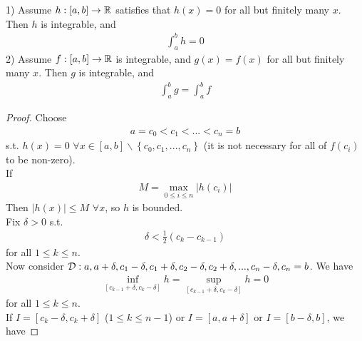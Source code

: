 \documentclass[a4paper]{article}
\begin{document}
\begin{prop}
1) Assume $h:\left[a,b\right]\to\mathbb{R}$ satisfies that $h\left(x\right)=0$ for all but finitely many $x$. Then $h$ is integrable, and
\begin{equation*}
\begin{aligned}
\int_a^b h = 0
\end{aligned}
\end{equation*}
2) Assume $f:\left[a,b\right] \to \mathbb{R}$ is integrable, and $g\left(x\right) = f\left(x\right)$ for all but finitely many $x$. Then $g$ is integrable, and
\begin{equation*}
\begin{aligned}
\int_a^b g = \int_a^b f
\end{aligned}
\end{equation*}
\begin{proof}
Choose
\begin{equation*}
\begin{aligned}
a=c_0 < c_1 < ... < c_n = b
\end{aligned}
\end{equation*}
s.t. $h\left(x\right) = 0$ $\forall x\in \left[a,b\right]\backslash\left\{c_0,c_1,...,c_n\right\}$ (it is not necessary for all of $f\left(c_i\right)$ to be non-zero).\\
If
\begin{equation*}
\begin{aligned}
M=\max_{0\leq i \leq n} |h\left(c_i\right)|
\end{aligned}
\end{equation*}
Then $|h\left(x\right)| \leq M$ $\forall x$, so $h$ is bounded.\\
Fix $\delta > 0$ s.t.
\begin{equation*}
\begin{aligned}
\delta < \frac{1}{2}\left(c_k - c_{k-1}\right)
\end{aligned}
\end{equation*}
for all $1\leq k \leq n$.\\
Now consider $\mathcal{D}: a,a+\delta, c_1-\delta, c_1+\delta, c_2-\delta, c_2+\delta,...,c_n-\delta,c_n=b$. We have
\begin{equation*}
\begin{aligned}
\inf_{\left[c_{k-1}+\delta, c_k-\delta\right]} h = \sup_{\left[c_{k-1}+\delta, c_k-\delta\right]} h = 0
\end{aligned}
\end{equation*}
for all $1\leq k \leq n$.\\
If $I=\left[c_k - \delta, c_k + \delta\right]$ ($1\leq k \leq n-1$) or $I=\left[a,a+\delta\right]$ or $I=\left[b-\delta,b\right]$, we have

\end{proof}
\end{prop}
\end{document}
